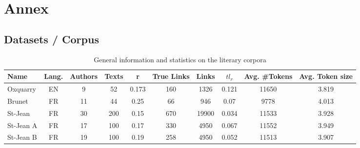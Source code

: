 \section{Annex \label{sec:annex}}

\subsection{Datasets / Corpus}
\label{sec:annex_dataset_corpus}

\begin{table*}
  \centering
  \caption{General information and statistics on the literary corpora}
  \label{tab:lit_corpora}
  \begin{tabular}{ l c c c c c c c c c }
    \toprule
    \textbf{Name} &
    \textbf{Lang.} &
    \textbf{Authors} &
    \textbf{Texts} &
    \textbf{r} &
    \textbf{True Links} &
    \textbf{Links} &
    \textbf{$tl_r$} &
    \textbf{Avg. \#Tokens} &
    \textbf{Avg. Token size} \\
    \midrule
    Oxquarry & EN & 9 & 52 & 0.173 & 160 & 1326 & 0.121 & 11650 & 3.819 \\
    Brunet & FR & 11 & 44 & 0.25 & 66 & 946 & 0.07 & 9778 & 4.013 \\
    St-Jean & FR & 30 & 200 & 0.15 & 670 & 19900 & 0.034 & 11533 & 3.928 \\
    St-Jean A & FR & 17 & 100 & 0.17 & 330 & 4950 & 0.067 & 11552 & 3.949 \\
    St-Jean B & FR & 19 & 100 & 0.19 & 258 & 4950 & 0.052 & 11513 & 3.907 \\
    \bottomrule
  \end{tabular}
\end{table*}

